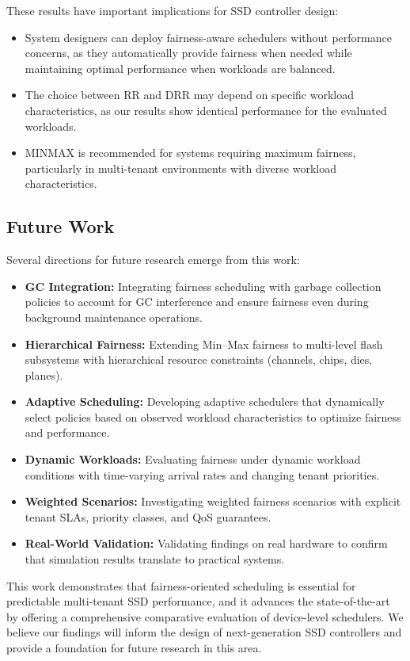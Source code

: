 \documentclass[11pt]{article}
\begin{document}
These results have important implications for SSD controller design:
\begin{itemize}
    \item System designers can deploy fairness-aware schedulers without performance concerns, as they automatically provide fairness when needed while maintaining optimal performance when workloads are balanced.
    \item The choice between RR and DRR may depend on specific workload characteristics, as our results show identical performance for the evaluated workloads.
    \item MINMAX is recommended for systems requiring maximum fairness, particularly in multi-tenant environments with diverse workload characteristics.
\end{itemize}

\subsection{Future Work}

Several directions for future research emerge from this work:
\begin{itemize}
    \item \textbf{GC Integration:} Integrating fairness scheduling with garbage collection policies to account for GC interference and ensure fairness even during background maintenance operations.
    \item \textbf{Hierarchical Fairness:} Extending Min--Max fairness to multi-level flash subsystems with hierarchical resource constraints (channels, chips, dies, planes).
    \item \textbf{Adaptive Scheduling:} Developing adaptive schedulers that dynamically select policies based on observed workload characteristics to optimize fairness and performance.
    \item \textbf{Dynamic Workloads:} Evaluating fairness under dynamic workload conditions with time-varying arrival rates and changing tenant priorities.
    \item \textbf{Weighted Scenarios:} Investigating weighted fairness scenarios with explicit tenant SLAs, priority classes, and QoS guarantees.
    \item \textbf{Real-World Validation:} Validating findings on real hardware to confirm that simulation results translate to practical systems.
\end{itemize}

This work demonstrates that fairness-oriented scheduling is essential for predictable multi-tenant SSD performance, and it advances the state-of-the-art by offering a comprehensive comparative evaluation of device-level schedulers. We believe our findings will inform the design of next-generation SSD controllers and provide a foundation for future research in this area.
\end{document}
